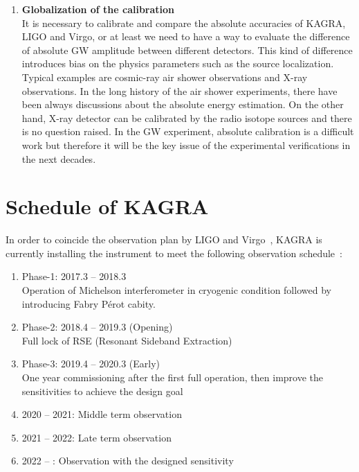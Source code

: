 \begin{enumerate}
\item {\bf Globalization of the calibration}\\
It is necessary to calibrate and compare the absolute accuracies of KAGRA, 
LIGO and Virgo, or at least we need to have a way to evaluate the difference 
of absolute GW amplitude between different detectors. This kind of difference 
introduces bias on the physics parameters such as the source localization. 
Typical examples are cosmic-ray air shower observations and X-ray 
observations. In the long history of the air shower experiments, 
there have been always discussions about the absolute energy estimation. 
On the other hand, X-ray detector can be calibrated by the radio isotope 
sources and there is no question raised. In the GW experiment, absolute 
calibration is a difficult work but therefore it will be the key issue of the 
experimental verifications in the next decades.

\end{enumerate}



\section{Schedule of KAGRA}

In order to coincide the observation plan by LIGO and Virgo~\cite{LV-obs},
KAGRA is currently installing the instrument to meet the following observation
schedule~\cite{KAGRA-obs}:

\begin{enumerate}
\item Phase-1: 2017.3 -- 2018.3\\
      Operation of Michelson interferometer in cryogenic condition 
      followed by introducing Fabry P\'{e}rot cabity.
\item Phase-2: 2018.4 -- 2019.3 (Opening)\\
      Full lock of RSE (Resonant Sideband Extraction)
\item Phase-3: 2019.4 -- 2020.3 (Early) \\
      One year commissioning after the first full operation, 
      then improve the sensitivities to achieve the design goal
\item 2020 -- 2021: Middle term observation
\item 2021 -- 2022: Late term observation
\item 2022 -- : Observation with the designed sensitivity

\end{enumerate}


